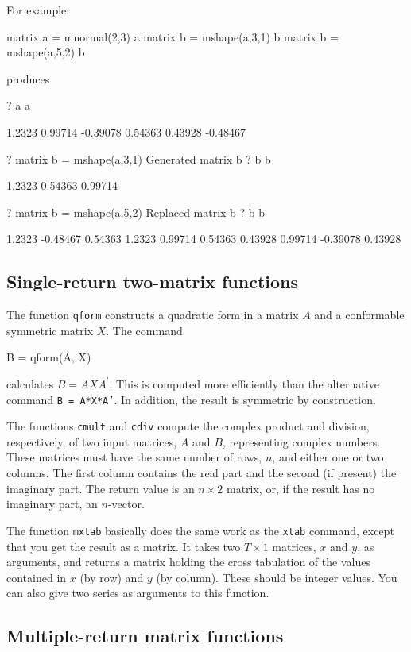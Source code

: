 For example:
\begin{code}
matrix a = mnormal(2,3)
a
matrix b = mshape(a,3,1)
b
matrix b = mshape(a,5,2)
b
\end{code}
produces
\begin{code}
?   a
a

      1.2323      0.99714     -0.39078
     0.54363      0.43928     -0.48467

?   matrix b = mshape(a,3,1)
Generated matrix b
?   b
b

      1.2323
     0.54363
     0.99714

?   matrix b = mshape(a,5,2)
Replaced matrix b
?   b
b

      1.2323     -0.48467
     0.54363       1.2323
     0.99714      0.54363
     0.43928      0.99714
    -0.39078      0.43928
\end{code}

\subsection{Single-return two-matrix functions}
\label{matrix-two}

The function \texttt{qform} constructs a quadratic form in a matrix
$A$ and a conformable symmetric matrix $X$.  The command
%
\begin{code}
B = qform(A, X)
\end{code}
%
calculates $B = A X A^{\prime}$.  This is computed more efficiently than
the alternative command \texttt{B = A*X*A'}.  In addition, the result
is symmetric by construction.

The functions \texttt{cmult} and \texttt{cdiv} compute the complex
product and division, respectively, of two input
matrices, $A$ and $B$, representing complex numbers.  These matrices
must have the same number of rows, $n$, and either one or two columns.
The first column contains the real part and the second (if present)
the imaginary part.  The return value is an $n \times 2$ matrix, or,
if the result has no imaginary part, an $n$-vector.

The function \texttt{mxtab} basically does the same work as the
\texttt{xtab} command, except that you get the result as a matrix.  It
takes two $T\times 1$ matrices, $x$ and $y$, as arguments, and returns
a matrix holding the cross tabulation of the values contained in $x$
(by row) and $y$ (by column). These should be integer values.  You can
also give two series as arguments to this function.


\subsection{Multiple-return matrix functions}
\label{matrix-multiples}

